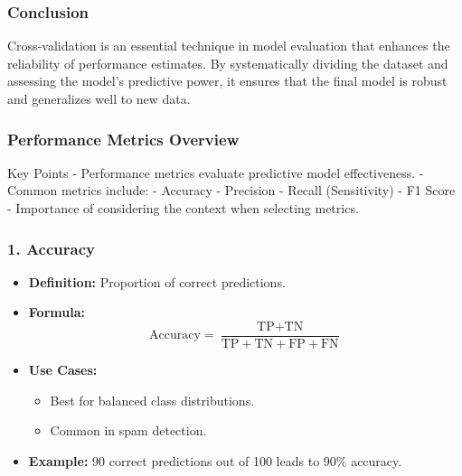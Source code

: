 \documentclass{beamer}
\begin{document}
\begin{frame}[fragile]
    \frametitle{Conclusion}
    Cross-validation is an essential technique in model evaluation that enhances the reliability of performance estimates. By systematically dividing the dataset and assessing the model's predictive power, it ensures that the final model is robust and generalizes well to new data.
\end{frame}

\begin{frame}[fragile]
    \frametitle{Performance Metrics Overview}
    \begin{block}{Key Points}
        - Performance metrics evaluate predictive model effectiveness.  
        - Common metrics include:  
            - Accuracy  
            - Precision  
            - Recall (Sensitivity)  
            - F1 Score  
        - Importance of considering the context when selecting metrics.
    \end{block}
\end{frame}

\begin{frame}[fragile]
    \frametitle{1. Accuracy}
    \begin{itemize}
        \item \textbf{Definition:} Proportion of correct predictions.
        \item \textbf{Formula:} 
        \begin{equation}
            \text{Accuracy} = \frac{\text{TP} + \text{TN}}{\text{TP} + \text{TN} + \text{FP} + \text{FN}}
        \end{equation}
        \item \textbf{Use Cases:} 
            \begin{itemize}
                \item Best for balanced class distributions.
                \item Common in spam detection.
            \end{itemize}
        \item \textbf{Example:}  
            90 correct predictions out of 100 leads to \(90\%\) accuracy.
    \end{itemize}
\end{frame}
\end{document}
